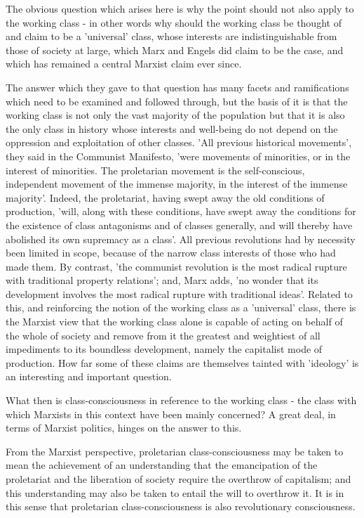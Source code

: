The obvious question which arises here is why the point should not also apply to the working class - in other words why should the working class be thought of and claim to be a 'universal' class, whose interests are indistinguishable from those of  society at large, which Marx and Engels did claim to be the case, and which has remained a central Marxist claim ever since.

The answer which they gave to that question has many facets and ramifications which need to be examined and followed through, but the basis of it is that the working class is not only the vast majority of the population but that it is also the only class in history whose interests and well-being do not depend on the oppression and exploitation of other classes. 'All previous historical movements', they said in the Communist Manifesto, 'were movements of minorities, or in the interest of minorities. The proletarian movement is the self-conscious, independent movement of the immense majority, in the interest of the immense majority'. Indeed, the proletariat, having swept away the old conditions of production, 'will, along with these conditions, have swept away the conditions for the existence of class antagonisms and of classes generally, and will thereby have abolished its own supremacy as a class'. All previous revolutions had by necessity been limited in scope, because of the narrow class interests of those who had made them. By contrast, 'the communist revolution is the most radical rupture with traditional property relations'; and, Marx adds, 'no wonder that its development involves the most radical rupture with traditional ideas'. Related to this, and reinforcing the notion of the working class as a 'universal' class, there is the Marxist view that the working class alone is capable of acting on behalf of the whole of society and remove from it the greatest and weightiest of all impediments to its boundless development, namely the capitalist mode of production. How far some of these claims are themselves tainted with 'ideology' is an interesting and important question.

What then is class-consciousness in reference to the working class - the class with which Marxists in this context have been mainly concerned? A great deal, in terms of Marxist politics, hinges on the answer to this.

From the Marxist perspective, proletarian class-consciousness may be taken to mean the achievement of an understanding that the emancipation of the proletariat and the liberation of society require the overthrow of capitalism; and this understanding may also be taken to entail the will to overthrow it. It is in this sense that proletarian class-consciousness is also revolutionary consciousness.

